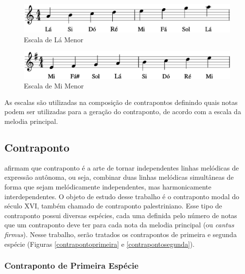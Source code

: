         \begin{figure}[htb]
          \centering
          \includegraphics[scale=0.6]{figuras/escalalamenor.eps}
          \caption{Escala de Lá Menor}
          \label{escalalamenor}
        \end{figure}

        \begin{figure}[htb]
          \centering
          \includegraphics[scale=0.45]{figuras/escalamimenor.eps}
          \caption{Escala de Mi Menor}
          \label{escalamimenor}
        \end{figure}

        As escalas são utilizadas na composição de contrapontos definindo quais notas podem ser utilizadas para a geração do contraponto, de acordo com a escala da melodia principal.

    \subsection[Contraponto]{Contraponto}

       afirmam que contraponto é a arte de tornar independentes linhas melódicas de expressão autônoma, ou seja, combinar duas linhas melódicas simultâneas de forma que sejam melódicamente independentes, mas harmonicamente interdependentes. O objeto de estudo desse trabalho é o contraponto modal do século XVI, também chamado de contraponto palestriniano. Esse tipo de contraponto possui diversas espécies, cada uma definida pelo número de notas que um contraponto deve ter para cada nota da melodia principal (ou \textit{cantus firmus}). Nesse trabalho, serão tratados os contrapontos de primeira e segunda espécie (Figuras \ref{contrapontoprimeira} e \ref{contrapontosegunda}).

      \subsubsection[Contraponto de Primeira Espécie]{Contraponto de Primeira Espécie}

